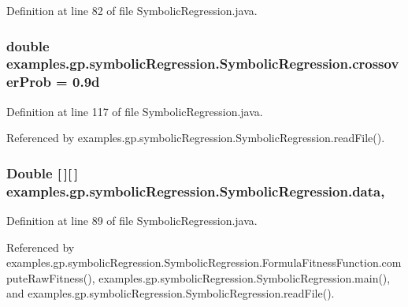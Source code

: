 Definition at line 82 of file Symbolic\-Regression.\-java.

\hypertarget{classexamples_1_1gp_1_1symbolic_regression_1_1_symbolic_regression_ab361726a240d44fec8def17768d460b4}{
\subsubsection[{crossover\-Prob}]{\setlength{\rightskip}{0pt plus 5cm}double examples.\-gp.\-symbolic\-Regression.\-Symbolic\-Regression.\-crossover\-Prob = 0.\-9d\hspace{0.3cm}{\ttfamily [static]}}}\label{classexamples_1_1gp_1_1symbolic_regression_1_1_symbolic_regression_ab361726a240d44fec8def17768d460b4}


Definition at line 117 of file Symbolic\-Regression.\-java.



Referenced by examples.\-gp.\-symbolic\-Regression.\-Symbolic\-Regression.\-read\-File().

\hypertarget{classexamples_1_1gp_1_1symbolic_regression_1_1_symbolic_regression_aa588c62a94fe721a95da78977de37d62}{
\subsubsection[{data}]{\setlength{\rightskip}{0pt plus 5cm}Double \mbox{[}$\,$\mbox{]}\mbox{[}$\,$\mbox{]} examples.\-gp.\-symbolic\-Regression.\-Symbolic\-Regression.\-data\hspace{0.3cm}{\ttfamily [static]}, {\ttfamily [protected]}}}\label{classexamples_1_1gp_1_1symbolic_regression_1_1_symbolic_regression_aa588c62a94fe721a95da78977de37d62}


Definition at line 89 of file Symbolic\-Regression.\-java.



Referenced by examples.\-gp.\-symbolic\-Regression.\-Symbolic\-Regression.\-Formula\-Fitness\-Function.\-compute\-Raw\-Fitness(), examples.\-gp.\-symbolic\-Regression.\-Symbolic\-Regression.\-main(), and examples.\-gp.\-symbolic\-Regression.\-Symbolic\-Regression.\-read\-File().

